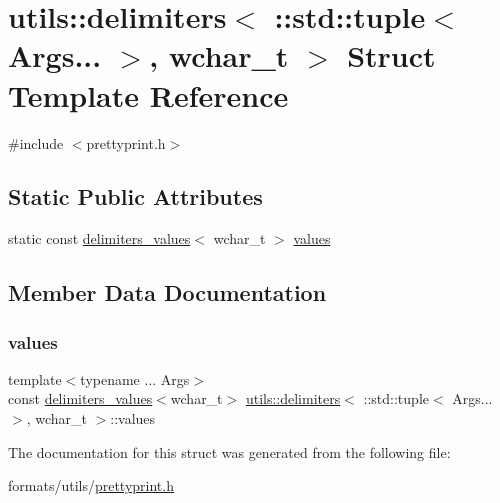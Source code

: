\hypertarget{structutils_1_1delimiters_3_01_1_1std_1_1tuple_3_01_args_8_8_8_01_4_00_01wchar__t_01_4}{}\section{utils\+::delimiters$<$ \+::std\+::tuple$<$ Args... $>$, wchar\+\_\+t $>$ Struct Template Reference}
\label{structutils_1_1delimiters_3_01_1_1std_1_1tuple_3_01_args_8_8_8_01_4_00_01wchar__t_01_4}


{\ttfamily \#include $<$prettyprint.\+h$>$}

\subsection*{Static Public Attributes}
\begin{DoxyCompactItemize}
\item 
static const \mbox{\hyperlink{structutils_1_1delimiters__values}{delimiters\+\_\+values}}$<$ wchar\+\_\+t $>$ \mbox{\hyperlink{structutils_1_1delimiters_3_01_1_1std_1_1tuple_3_01_args_8_8_8_01_4_00_01wchar__t_01_4_a3ca4aa1d03b09299a3d820f9a05dfebb}{values}}
\end{DoxyCompactItemize}


\subsection{Member Data Documentation}
\mbox{\label{structutils_1_1delimiters_3_01_1_1std_1_1tuple_3_01_args_8_8_8_01_4_00_01wchar__t_01_4_a3ca4aa1d03b09299a3d820f9a05dfebb}} 
\subsubsection{\texorpdfstring{values}{values}}
{\footnotesize\ttfamily template$<$typename ... Args$>$ \\
const \mbox{\hyperlink{structutils_1_1delimiters__values}{delimiters\+\_\+values}}$<$wchar\+\_\+t$>$ \mbox{\hyperlink{structutils_1_1delimiters}{utils\+::delimiters}}$<$ \+::std\+::tuple$<$ Args... $>$, wchar\+\_\+t $>$\+::values\hspace{0.3cm}{\ttfamily [static]}}



The documentation for this struct was generated from the following file\+:\begin{DoxyCompactItemize}
\item 
formats/utils/\mbox{\hyperlink{prettyprint_8h}{prettyprint.\+h}}\end{DoxyCompactItemize}

